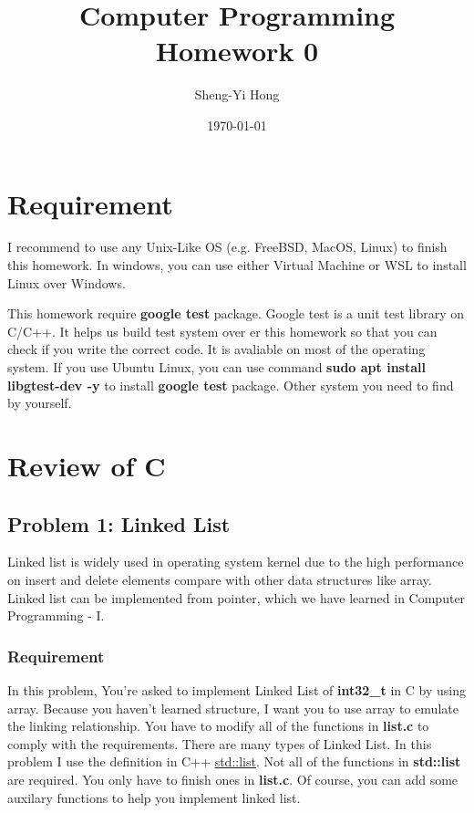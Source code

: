 \documentclass{report}
\title{Computer Programming Homework 0}
\author{Sheng-Yi Hong}
\date{\today}
\begin{document}
\maketitle

\tableofcontents

\chapter{Requirement}

I recommend to use any Unix-Like OS (e.g. FreeBSD, MacOS, Linux) to finish this
homework. In windows, you can use either Virtual Machine or WSL to install Linux over Windows.

This homework require \textbf{google test} package. Google test is a unit test
library on C/C++. It helps us build test system over
er this homework so that you can check
if you write the correct code. It is avaliable on most of the operating system.
If you use Ubuntu Linux, you can use command \textbf{sudo apt install
  libgtest-dev -y} to install \textbf{google test} package. Other system you need to find by yourself.

\chapter{Review of C}

\section{Problem 1: Linked List}

Linked list is widely used in operating system kernel due to the high
performance on insert and delete elements compare with other data structures like
array. Linked list can be implemented from pointer, which we have learned in
Computer Programming - I.

\subsection{Requirement}

In this problem, You're asked to implement Linked List of \textbf{int32\_t} in C by
using array. Because you haven't learned structure, I want you to use array to
emulate the linking relationship. You have to modify all of the functions in \textbf{list.c} to
comply with the requirements. There are many types of Linked List. In this
problem I use the definition in C++
\href{https://en.cppreference.com/w/cpp/container/list}{std::list}. Not all of
the functions in \textbf{std::list} are required. You only have to finish ones in
\textbf{list.c}. Of course, you can add some auxilary functions to help you
implement linked list.
\end{document}

